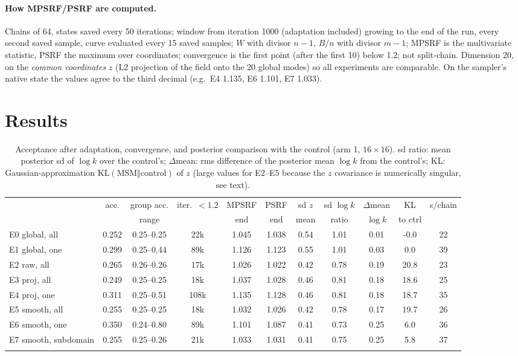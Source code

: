 \documentclass[10pt]{article}
\begin{document}
\paragraph{How MPSRF/PSRF are computed.} Chains of 64, states saved every 50 iterations; window from iteration 1000 (adaptation included) growing to the end of the run, every second saved sample, curve evaluated every 15 saved samples; $W$ with divisor $n-1$, $B/n$ with divisor $m-1$; MPSRF is the multivariate statistic, PSRF the maximum over coordinates; convergence is the first point (after the first 10) below 1.2; not split-chain. Dimension 20, on the \emph{common coordinates} $z$ (L2 projection of the field onto the 20 global modes) so all experiments are comparable. On the sampler's native state the values agree to the third decimal (e.g.\ E4 1.135, E6 1.101, E7 1.033).

\section{Results}
\begin{table}[h]\centering\footnotesize
\begin{tabular}{lcccccccccc}\toprule
 & acc. & group acc. & iter.\ $<1.2$ & MPSRF & PSRF & sd $z$ & sd $\log k$ & $\Delta$mean & KL & s/chain\\
 &  & range &  & end & end & mean & ratio & $\log k$ & to ctrl &\\\midrule
E0 global, all & 0.252 & 0.25--0.25 & 22k & 1.045 & 1.038 & 0.54 & 1.01 & 0.01 & -0.0 & 22\\
E1 global, one & 0.299 & 0.25--0.44 & 89k & 1.126 & 1.123 & 0.55 & 1.01 & 0.03 & 0.0 & 39\\
E2 raw, all & 0.265 & 0.26--0.26 & 17k & 1.026 & 1.022 & 0.42 & 0.78 & 0.19 & 20.8 & 23\\
E3 proj, all & 0.249 & 0.25--0.25 & 18k & 1.037 & 1.028 & 0.46 & 0.81 & 0.18 & 18.6 & 25\\
E4 proj, one & 0.311 & 0.25--0.51 & 108k & 1.135 & 1.128 & 0.46 & 0.81 & 0.18 & 18.7 & 35\\
E5 smooth, all & 0.255 & 0.25--0.25 & 18k & 1.032 & 1.026 & 0.42 & 0.78 & 0.17 & 19.7 & 26\\
E6 smooth, one & 0.350 & 0.24--0.80 & 89k & 1.101 & 1.087 & 0.41 & 0.73 & 0.25 & 6.0 & 36\\
E7 smooth, subdomain & 0.255 & 0.25--0.26 & 21k & 1.033 & 1.031 & 0.41 & 0.75 & 0.25 & 5.8 & 37\\\\\bottomrule\end{tabular}
\caption{Acceptance after adaptation, convergence, and posterior comparison with the control (arm 1, $16\times16$). sd ratio: mean posterior sd of $\log k$ over the control's; $\Delta$mean: rms difference of the posterior mean $\log k$ from the control's; KL: Gaussian-approximation KL$(\text{MSM}\Vert\text{control})$ of $z$ (large values for E2--E5 because the $z$ covariance is numerically singular, see text).}\end{table}
\end{document}
